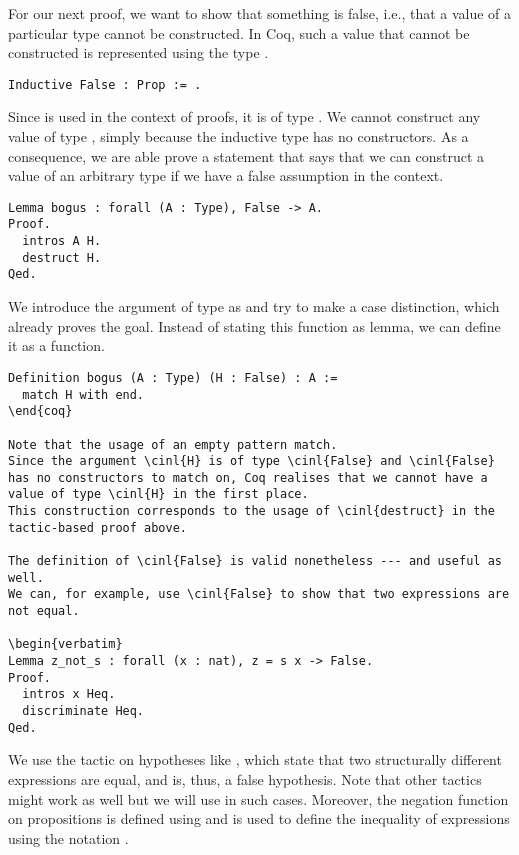 For our next proof, we want to show that something is false, i.e., that a value of a particular type cannot be constructed.
In Coq, such a value that cannot be constructed is represented using the type .

\begin{verbatim}
Inductive False : Prop := .
\end{verbatim}

Since  is used in the context of proofs, it is of type .
We cannot construct any value of type , simply because the inductive type has no constructors.
As a consequence, we are able prove a statement that says that we can construct a value of an arbitrary type if we have a false assumption in the context.

\begin{verbatim}
Lemma bogus : forall (A : Type), False -> A.
Proof.
  intros A H.
  destruct H.
Qed.
\end{verbatim}

We introduce the argument of type  as  and try to make a case distinction, which already proves the goal.
Instead of stating this function as lemma, we can define it as a function.

\begin{verbatim}
Definition bogus (A : Type) (H : False) : A :=
  match H with end.
\end{coq}

Note that the usage of an empty pattern match.
Since the argument \cinl{H} is of type \cinl{False} and \cinl{False} has no constructors to match on, Coq realises that we cannot have a value of type \cinl{H} in the first place.
This construction corresponds to the usage of \cinl{destruct} in the tactic-based proof above.

The definition of \cinl{False} is valid nonetheless --- and useful as well.
We can, for example, use \cinl{False} to show that two expressions are not equal.

\begin{verbatim}
Lemma z_not_s : forall (x : nat), z = s x -> False.
Proof.
  intros x Heq.
  discriminate Heq.
Qed.
\end{verbatim}

We use the tactic  on hypotheses like , which state that two structurally different expressions are equal, and is, thus, a false hypothesis.
Note that other tactics might work as well but we will use  in such cases.
Moreover, the negation function  on propositions is defined using  and is used to define the inequality of expressions using the notation \cinl{<>}.


